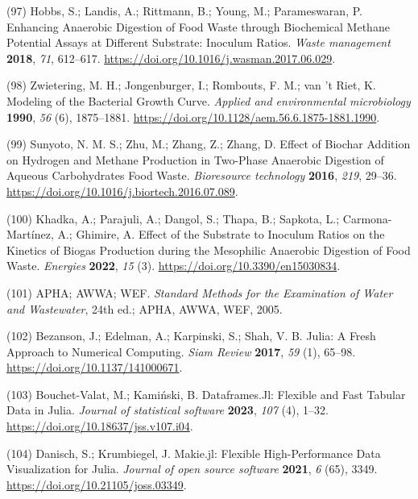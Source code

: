 \documentclass[11pt]{report}
\begin{document}
\hypertarget{citeproc_bib_item_97}{(97) Hobbs, S.; Landis, A.; Rittmann, B.; Young, M.; Parameswaran, P. Enhancing Anaerobic Digestion of Food Waste through Biochemical Methane Potential Assays at Different Substrate: Inoculum Ratios. \textit{Waste management} \textbf{2018}, \textit{71}, 612–617. \url{https://doi.org/10.1016/j.wasman.2017.06.029}.}

\hypertarget{citeproc_bib_item_98}{(98) Zwietering, M. H.; Jongenburger, I.; Rombouts, F. M.; van ’t Riet, K. Modeling of the Bacterial Growth Curve. \textit{Applied and environmental microbiology} \textbf{1990}, \textit{56} (6), 1875–1881. \url{https://doi.org/10.1128/aem.56.6.1875-1881.1990}.}

\hypertarget{citeproc_bib_item_99}{(99) Sunyoto, N. M. S.; Zhu, M.; Zhang, Z.; Zhang, D. Effect of Biochar Addition on Hydrogen and Methane Production in Two-Phase Anaerobic Digestion of Aqueous Carbohydrates Food Waste. \textit{Bioresource technology} \textbf{2016}, \textit{219}, 29–36. \url{https://doi.org/10.1016/j.biortech.2016.07.089}.}

\hypertarget{citeproc_bib_item_100}{(100) Khadka, A.; Parajuli, A.; Dangol, S.; Thapa, B.; Sapkota, L.; Carmona-Martínez, A.; Ghimire, A. Effect of the Substrate to Inoculum Ratios on the Kinetics of Biogas Production during the Mesophilic Anaerobic Digestion of Food Waste. \textit{Energies} \textbf{2022}, \textit{15} (3). \url{https://doi.org/10.3390/en15030834}.}

\hypertarget{citeproc_bib_item_101}{(101) APHA; AWWA; WEF. \textit{Standard Methods for the Examination of Water and Wastewater}, 24th ed.; APHA, AWWA, WEF, 2005.}

\hypertarget{citeproc_bib_item_102}{(102) Bezanson, J.; Edelman, A.; Karpinski, S.; Shah, V. B. Julia: A Fresh Approach to Numerical Computing. \textit{Siam Review} \textbf{2017}, \textit{59} (1), 65–98. \url{https://doi.org/10.1137/141000671}.}

\hypertarget{citeproc_bib_item_103}{(103) Bouchet-Valat, M.; Kamiński, B. Dataframes.Jl: Flexible and Fast Tabular Data in Julia. \textit{Journal of statistical software} \textbf{2023}, \textit{107} (4), 1–32. \url{https://doi.org/10.18637/jss.v107.i04}.}

\hypertarget{citeproc_bib_item_104}{(104) Danisch, S.; Krumbiegel, J. Makie.jl: Flexible High-Performance Data Visualization for Julia. \textit{Journal of open source software} \textbf{2021}, \textit{6} (65), 3349. \url{https://doi.org/10.21105/joss.03349}.}
\end{document}
